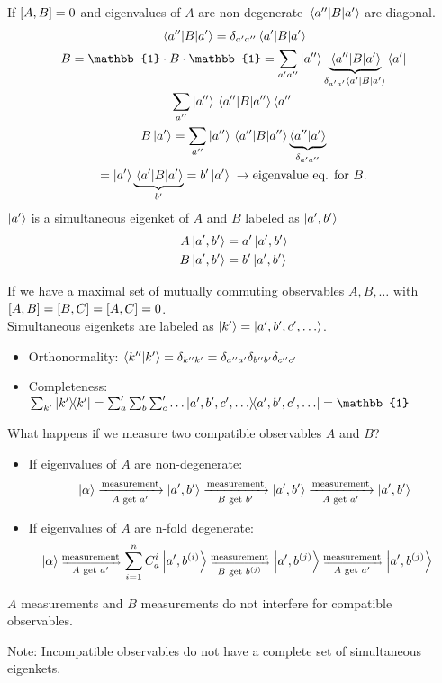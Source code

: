 \begin{frame}
	If $\comm{A}{B} = 0$ and eigenvalues of $A$ are non-degenerate $ \mel{a''}{B}{a'} $ are diagonal.
	\begin{gather*}
		\mel{a''}{B}{a'}  = \delta_{a'a''} \ev{B}{a'}\\
		B = \mathbb{1}\cdot B \cdot \mathbb{1} = \sum_{a' a''} \ket{a''} \underbrace{\mel{a''}{B}{a'} }_{\delta_{a'a'} \ev{B}{a'}}\bra{a'}\\
		\sum_{a''}\ket{a''}\mel{a''}{B}{a''} \bra{a''}\\
		B\ket{a'} = \sum_{a''} \ket{a''}\mel{a''}{B}{a''}\underbrace{\ip{a''}{a'}}_{\delta_{a'a''}}\\
		= \ket{a'} \underbrace{\mel{a'}{B}{a'}}_{b'} = b'\ket{a'} \; \to \text{eigenvalue eq. for }B.
	\end{gather*}
	$\ket{a'}$ is a simultaneous eigenket of $A$ and $B$ labeled as $\ket{a',b'}$
	\begin{align*}
		A\ket{a',b'} & =a'\ket{a',b'} \\
		B\ket{a',b'} & =b'\ket{a',b'}
	\end{align*}
\end{frame}

\begin{frame}
	If we have a maximal set of mutually commuting observables $A,B,\dots$ with $\comm{A}{B}=\comm{B}{C}=\comm{A}{C}= 0$.\\
	Simultaneous eigenkets are labeled as $\ket{k'} = \ket{a',b',c',\dots}$.
	\begin{itemize}
		\item Orthonormality: $\ip{k''}{k'} = \delta_{k''k'}=\delta_{a''a'}\delta_{b''b'}\delta_{c''c'}$
		\item Completeness: $\sum_{k'}\op{k'} = \sum_a' \sum_b' \sum_c' \dots \op{a',b',c',\dots} = \mathbb{1}$
	\end{itemize}
\end{frame}

\begin{frame}{What happens if we measure two compatible observables $A$ and $B$?}
	\begin{itemize}
		\item If eigenvalues of $A$ are non-degenerate:
		      \[
			      \ket{\alpha} \xrightarrow[A \text{ get } a']{\text{measurement}} \ket{a',b'} \xrightarrow[B \text{ get } b']{\text{measurement}} \ket{a',b'}\xrightarrow[A \text{ get } a']{\text{measurement}}\ket{a',b'}
		      \]
		\item If eigenvalues of $A$ are n-fold degenerate:
		      \[\tiny \hspace{-4mm}
			      \ket{\alpha} \xrightarrow[A \text{ get } a']{\text{measurement}} \sum_{i=1}^n C_{a}^{i}\ket{a',b^{(i)}} \xrightarrow[B \text{ get } b^{(j)}]{\text{measurement}} \ket{a',b^{(j)}}\xrightarrow[A \text{ get } a']{\text{measurement}}\ket{a',b^{(j)}}
		      \]
	\end{itemize}

	$A$ measurements and $B$ measurements do not interfere for compatible observables.

	Note: Incompatible observables do not have a complete set of simultaneous eigenkets.
\end{frame}

